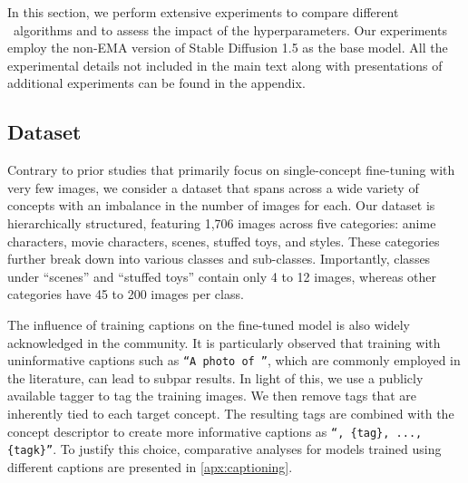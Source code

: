 In this section, we perform extensive experiments to compare different \lycoris~algorithms and to assess the impact of the hyperparameters. Our experiments employ the non-EMA version of Stable Diffusion 1.5
as the base model.
All the experimental details not included in the main text along with presentations of additional experiments can be found in the appendix.

\subsection{Dataset}

Contrary to prior studies that primarily focus on single-concept fine-tuning with very few images, we consider a dataset that spans across a wide variety of concepts with an imbalance in the number of images for each.
Our dataset is hierarchically structured, featuring 1,706 images across five categories: anime characters, movie characters, scenes, stuffed toys, and styles. These categories further break down into various classes and sub-classes. 
Importantly, classes under ``scenes'' and ``stuffed toys'' contain only 4 to 12 images, whereas other categories have 45 to 200 images per class.

The influence of training captions on the fine-tuned model is also widely acknowledged in the community.
It is particularly observed that training with uninformative captions such as \texttt{``A photo of \trainingword''}, which are commonly employed in the literature, can lead to subpar results.
In light of this, we use a publicly available tagger
to tag the training images.
We then remove tags that are inherently tied to each target concept. The resulting tags are combined with the concept descriptor to create more informative captions as \texttt{``\trainingword, \{tag\}, ..., \{tag\thinspace k\}''}. 
To justify this choice, comparative analyses for models trained using different captions are presented in \cref{apx:captioning}.



